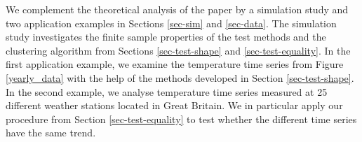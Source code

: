 We complement the theoretical analysis of the paper by a simulation study and two application examples in Sections \ref{sec-sim} and \ref{sec-data}. The simulation study investigates the finite sample properties of the test methods and the clustering algorithm from Sections \ref{sec-test-shape} and \ref{sec-test-equality}. In the first application example, we examine the temperature time series from Figure \ref{yearly_data} with the help of the methods developed in Section \ref{sec-test-shape}. In the second example, we analyse temperature time series measured at 25 different weather stations located in Great Britain. We in particular apply our procedure from Section \ref{sec-test-equality} to test whether the different time series have the same trend. 


